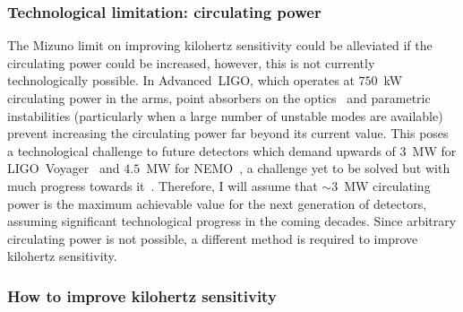 \subsubsection{Technological limitation: circulating power}

The Mizuno limit on improving kilohertz sensitivity could be alleviated if the circulating power could be increased, however, this is not currently technologically possible. In Advanced~LIGO, which operates at $750$~kW circulating power in the arms, point absorbers on the optics~\cite{Brooks_2021} and parametric instabilities (particularly when a large number of unstable modes are available)~\cite{PhysRevLett.114.161102} prevent increasing the circulating power far beyond its current value. This poses a technological challenge to future detectors which demand upwards of $3$~MW for LIGO~Voyager~\cite{} and $4.5$~MW for NEMO~\cite{}, a challenge yet to be solved but with much progress towards it~\cite{}. %
Therefore, I will assume that $\sim3$~MW circulating power is the maximum achievable value for the next generation of detectors, assuming significant technological progress in the coming decades. Since arbitrary circulating power is not possible, a different method is required to improve kilohertz sensitivity.



\subsubsection{How to improve kilohertz sensitivity}

